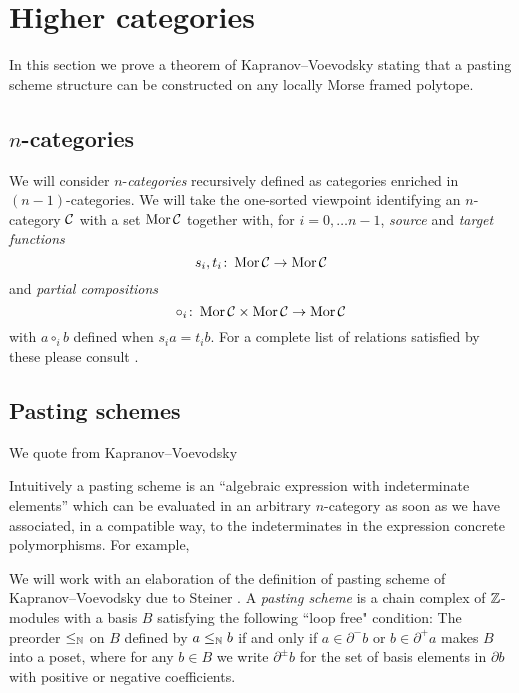 
\section{Higher categories}

In this section we prove a theorem of Kapranov--Voevodsky \cite[Theorem 2.3]{kapranov1991polycategory} stating that a pasting scheme structure can be constructed on any locally Morse framed polytope.

\subsection{$n$-categories}

We will consider $n$-\textit{categories} recursively defined as categories enriched in $(n-1)$-categories.
We will take the one-sorted viewpoint identifying an $n$-category $\mathcal{C}$ with a set $\operatorname{Mor}\mathcal{C}$ together with, for $i = 0,\dots n-1$, \textit{source} and \textit{target functions}
\[
s_i, t_i \colon \operatorname{Mor}\mathcal{C} \to \operatorname{Mor}\mathcal{C}
\]
and \textit{partial compositions}
\[
\circ_i \colon \operatorname{Mor}\mathcal{C} \times \operatorname{Mor}\mathcal{C} \to \operatorname{Mor}\mathcal{C}
\]
with $a \circ_i b$ defined when $s_i a = t_i b$.
For a complete list of relations satisfied by these please consult \cite[Definition 2.1]{steiner2004omega}.

\subsection{Pasting schemes}

We quote from Kapranov--Voevodsky \cite[p.~12]{kapranov1991polycategory}
\begin{displayquote}
	Intuitively a pasting scheme is an ``algebraic expression with indeterminate elements'' which can be evaluated in an arbitrary $n$-category as soon as we have associated, in a compatible way, to the indeterminates in the expression concrete polymorphisms.
	For example,
	\begin{center}
		
	\end{center}
\end{displayquote}
We will work with an elaboration of the definition of pasting scheme of Kapranov--Voevodsky due to Steiner \cite{steiner2004omega}.
A \textit{pasting scheme} is a chain complex of $\mathbb{Z}$-modules with a basis $B$ satisfying the following ``loop free" condition:
The preorder $\leq_{\mathbb{N}}$ on $B$ defined by $a \leq_{\mathbb{N}} b$ if and only if $a \in \partial^- b$ or $b \in \partial^+ a$ makes $B$ into a poset, where for any $b \in B$ we write $\partial^\pm b$ for the set of basis elements in $\partial b$ with positive or negative coefficients.

